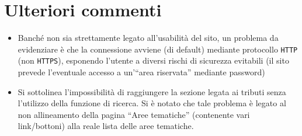 \section{Ulteriori commenti}

\begin{itemize}
    \item Banché non sia strettamente legato all'usabilità del sito, un problema
          da evidenziare è che la connessione avviene (di default) mediante
          protocollo \texttt{HTTP} (non \texttt{HTTPS}), esponendo l'utente a
          diversi rischi di sicurezza evitabili (il sito prevede l'eventuale
          accesso a un'``area riservata'' mediante password)
    \item Si sottolinea l'impossibilità di raggiungere la sezione legata ai
          tributi senza l'utilizzo della funzione di ricerca. Si è notato che
          tale problema è legato al non allineamento della pagina ``Aree
          tematiche'' (contenente vari link/bottoni) alla reale lista delle aree
          tematiche.
\end{itemize}

